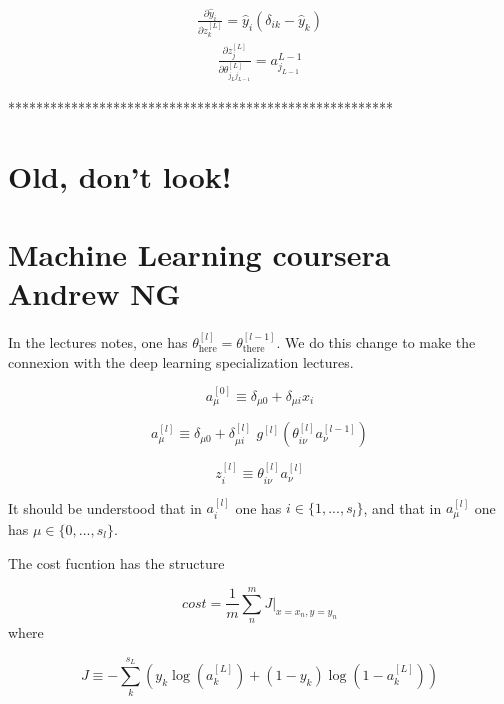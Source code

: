 \documentclass[a4paper,11pt]{article}
\newcommand{\na}[2]{a_{#1}^{[#2]}}
\newcommand{\nz}[2]{z_{#1}^{[#2]}}
\newcommand{\nt}[3]{\theta_{#1 #2}^{[#3]}}
\newcommand{\ff}[2]{#1 \left(#2 \right)}
\begin{document}
\begin{align}
 \frac{ \partial \hat{y}_i}{\partial z_k^{[L]} } =\hat{y}_i(  \delta_{ik} -   \hat{y}_k) 
\end{align}
\begin{align}
\frac{ \partial z_j^{[L]} } {\partial  \nt{j_L}{j_{L-1}}{L}  }  =  a^{L-1}_{j_{L-1}}
\end{align}

*******************************************************

\section{Old, don't look!}





\section{Machine Learning coursera Andrew NG}

In the lectures notes, one has 
$\theta^{[l]}_{\text{here}}=\theta^{[l-1]}_{\text{there}}$.
We do this change to make the connexion with the 
deep learning specialization lectures.

\begin{equation}
    \na{\mu}{0} \equiv \delta_{\mu0}+\delta_{\mu i} x_i %
\end{equation}

\begin{equation}
    \na{\mu}{l} \equiv \delta_{\mu0} +\delta_{\mu i }^{[l]}\,\,
    \ff{g^{[l]}}{  \nt{i}{\nu}{l}\na{\nu }{l-1}  }  %
\end{equation}

\begin{equation}
    \nz{i}{l}\equiv \nt{i}{\nu}{l}\na{\nu }{l} %
\end{equation}



It should be understood that in $\na{i}{l}$ 
one has  $i \in \{1,..., s_l\} $, 
and that in $\na{\mu}{l}$ one has $ \mu \in \{0,..., s_l\}$.


The cost fucntion has the structure

\begin{equation}
    cost=\frac1m \sum^m_n 
    J \Big\vert_{x=x_n,y=y_n}  %
\end{equation}
where

\begin{equation}
    J\equiv -\sum^{s_L}_k
    \left(
        y_k\ff{\log}{\na{k}{L}}  %
        +(1-y_k)\ff{\log}{1-\na{k}{L}} 
    \right)
\end{equation}
\end{document}
